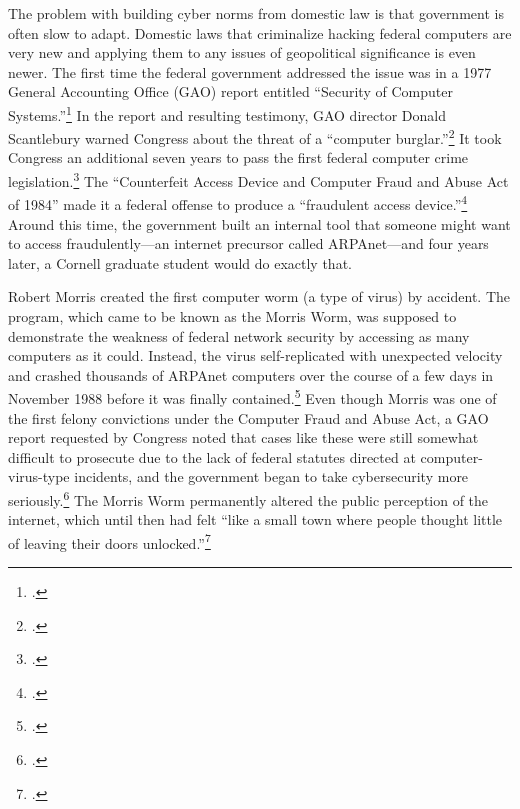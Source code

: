 \documentclass{memoir}
\begin{document}
\begin{refsegment}
The problem with building cyber norms from domestic law is that government is often slow to adapt. Domestic laws that criminalize hacking federal computers are very new and applying them to any issues of geopolitical significance is even newer. The first time the federal government addressed the issue was in a 1977 General Accounting Office (GAO) report entitled ``Security of Computer Systems.''\footcite{washington_post_staff_timeline_2003} In the report and resulting testimony, GAO director Donald Scantlebury warned Congress about the threat of a ``computer burglar.''\footcite{u.s._government_accounting_office_security_1977} It took Congress an additional seven years to pass the first federal computer crime legislation.\footcite[The later bill cited here, the Computer Security Act of 1987, describes the 1984 bill as being the first federal legislation in this area.]{glickman_computer_1988} The ``Counterfeit Access Device and Computer Fraud and Abuse Act of 1984'' made it a federal offense to produce a ``fraudulent access device.''\footcite{hughes_access_1984} Around this time, the government built an internal tool that someone might want to access fraudulently---an internet precursor called ARPAnet---and four years later, a Cornell graduate student would do exactly that.

Robert Morris created the first computer worm (a type of virus) by accident. The program, which came to be known as the Morris Worm, was supposed to demonstrate the weakness of federal network security by accessing as many computers as it could. Instead, the virus self-replicated with unexpected velocity and crashed thousands of ARPAnet computers over the course of a few days in November 1988 before it was finally contained.\footcite[This source, a master's thesis for the USAF Air University, makes the dramatic and completely unsubstantiated claim that the Morris worm infected half of of ARPAnet's 88,000 computers. The more popular (and plausible) claim is that of the roughly 60,000 ARPAnet-connected computers, the worm infected 10\% of them, though that number is not particularly well substantiated either.]{moore_conception_2014} Even though Morris was one of the first felony convictions under the Computer Fraud and Abuse Act, a GAO report requested by Congress noted that cases like these were still somewhat difficult to prosecute due to the lack of federal statutes directed at computer-virus-type incidents, and the government began to take cybersecurity more seriously.\footcite{u._s._government_accounting_office_computer_1989} The Morris Worm permanently altered the public perception of the internet, which until then had felt ``like a small town where people thought little of leaving their doors unlocked.''\footcite{lee_how_2013}


\end{refsegment}
\end{document}
